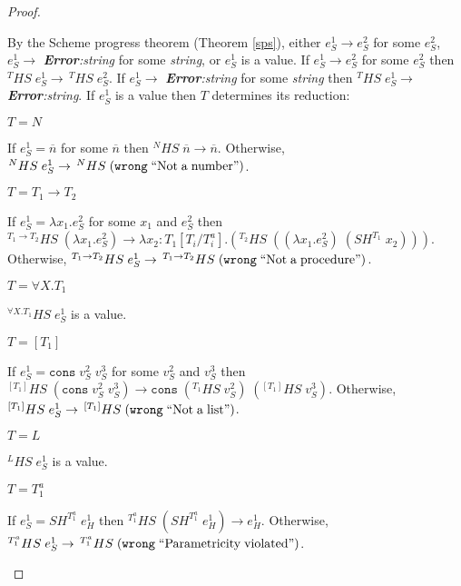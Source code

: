 \begin{theorem}
\begin{proof}
\begin{case}
By the Scheme progress theorem (Theorem \ref{sps}), either $e_{S}^{1}\rightarrow e_{S}^{2}$ for some $e_{S}^{2}$, $e_{S}^{1}\rightarrow$ \emph{\textbf{Error}:\;string} for some \emph{string}, or $e_{S}^{1}$ is a value.  If $e_{S}^{1}\rightarrow e_{S}^{2}$ for some $e_{S}^{2}$ then $^{T}HS\;e_{S}^{1}\rightarrow\,^{T}HS\;e_{S}^{2}$.  If $e_{S}^{1}\rightarrow$ \emph{\textbf{Error}:\;string} for some \emph{string} then $^{T}HS\;e_{S}^{1}\rightarrow$ \emph{\textbf{Error}:\;string}.  If $e_{S}^{1}$ is a value then $T$ determines its reduction:
\begin{case}
$T=N$

If $e_{S}^{1}=\overline{n}$ for some $\overline{n}$ then $^{N}HS\;\overline{n}\rightarrow\overline{n}$.  Otherwise, $^{N}HS\;e_{S}^{1}\rightarrow\,^{N}HS\;(\mathtt{wrong}\;\mathrm{``Not\;a\;number"})$.
\end{case}
\begin{case}
$T=T_{1}\rightarrow T_{2}$

If $e_{S}^{1}=\lambda x_{1}.e_{S}^{2}$ for some $x_{1}$ and $e_{S}^{2}$ then $^{T_{1}\rightarrow T_{2}}HS\;(\lambda x_{1}.e_{S}^{2})\rightarrow\lambda x_{2}:T_{1}[T_{i}/T^{a}_{i}].(^{T_{2}}HS\;((\lambda x_{1}.e_{S}^{2})\;(SH^{T_{1}}\;x_{2})))$.  Otherwise, $^{T_{1}\rightarrow T_{2}}HS\;e_{S}^{1}\rightarrow\,^{T_{1}\rightarrow T_{2}}HS\;(\mathtt{wrong}\;\mathrm{``Not\;a\;procedure"})$.
\end{case}
\begin{case}
$T=\forall X.T_{1}$

$^{\forall X.T_{1}}HS\;e_{S}^{1}$ is a value.
\end{case}
\begin{case}
$T=[T_{1}]$

If $e_{S}^{1}=\mathtt{cons}\;v_{S}^{2}\;v_{S}^{3}$ for some $v_{S}^{2}$ and $v_{S}^{3}$ then $^{[T_{1}]}HS\;(\mathtt{cons}\;v_{S}^{2}\;v_{S}^{3})\rightarrow\mathtt{cons}\;(^{T_{1}}HS\;v_{S}^{2})\;(^{[T_{1}]}HS\;v_{S}^{3})$.  Otherwise, $^{[T_{1}]}HS\;e_{S}^{1}\rightarrow\,^{[T_{1}]}HS\;(\mathtt{wrong}\;\mathrm{``Not\;a\;list"})$.
\end{case}
\begin{case}
$T=L$

$^{L}HS\;e_{S}^{1}$ is a value.
\end{case}
\begin{case}
$T=T_{1}^{a}$

If $e_{S}^{1}=SH^{T_{1}^{a}}\;e_{H}^{1}$ then $^{T_{1}^{a}}HS\;(SH^{T_{1}^{a}}\;e_{H}^{1})\rightarrow e_{H}^{1}$.  Otherwise, $^{T_{1}^{a}}HS\;e_{S}^{1}\rightarrow\,^{T_{1}^{a}}HS\;(\mathtt{wrong}\;\mathrm{``Parametricity\;violated"})$.
\end{case}
\end{case}
\end{proof}
\end{theorem}